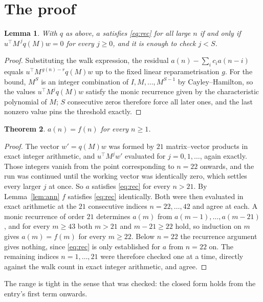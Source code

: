 \documentclass[11pt,a4paper]{article}
\theoremstyle{plain}
\newtheorem{theorem}{Theorem}
\newtheorem{lemma}[theorem]{Lemma}
\theoremstyle{definition}
\begin{document}
\section{The proof}

\begin{lemma}\label{lem:crit}
With $q$ as above, $a$ satisfies \eqref{eq:rec} for all large $n$ if and only if
$u^{\!\top}M^{\,j}q(M)w=0$ for every $j\ge0$, and it is enough to check $j<S$.
\end{lemma}

\begin{proof}
Substituting the walk expression, the residual $a(n)-\sum_ic_ia(n-i)$ equals
$u^{\!\top}M^{\,g(n)-r}q(M)w$ up to the fixed linear reparametrisation $g$. For the bound,
$M^{S}$ is an integer combination of $I,M,\dots,M^{S-1}$ by Cayley--Hamilton, so the values
$u^{\!\top}M^{j}q(M)w$ satisfy the monic recurrence given by the characteristic polynomial of
$M$; $S$ consecutive zeros therefore force all later ones, and the last nonzero value pins the
threshold exactly.
\end{proof}

\begin{theorem}
$a(n)=f(n)$ for every $n\ge1$.
\end{theorem}

\begin{proof}
The vector $w'=q(M)w$ was formed by $21$ matrix--vector products in exact integer
arithmetic, and $u^{\!\top}M^{j}w'$ evaluated for $j=0,1,\dots$, again exactly. Those integers
vanish from the point corresponding to $n=22$ onwards, and the run was continued until the
working vector was identically zero, which settles every larger $j$ at once. So $a$ satisfies
\eqref{eq:rec} for every $n>21$. By Lemma~\ref{lem:ann} $f$ satisfies \eqref{eq:rec}
identically. Both were then evaluated in exact arithmetic at the $21$ consecutive indices
$n=22,\dots,42$ and agree at each. A monic recurrence of order $21$
determines $a(m)$ from $a(m-1),\dots,a(m-21)$, and for every $m\ge43$ both
$m>21$ and $m-21\ge22$ hold, so induction on $m$ gives $a(m)=f(m)$ for every
$m\ge22$.
Below $n=22$ the recurrence argument gives nothing, since \eqref{eq:rec} is only
established for $a$ from $n=22$ on. The remaining indices $n=1,\dots,21$ were
therefore checked one at a time, directly against the walk count in exact integer arithmetic,
and agree.
\end{proof}

The range is tight in the sense that was checked: the closed form holds from the entry's first term onwards.
\end{document}
